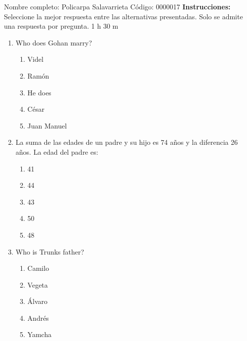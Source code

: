\documentclass[letterpaper,addpoints,answers,twocolumn,10pt]{exam}
\begin{document}
\noindent Nombre completo: Policarpa Salavarrieta
\newline \newline \newline \newline
Código: 0000017\newline \newline 
{\bf Instrucciones:} Seleccione la mejor respuesta entre las alternativas presentadas. Solo se admite una respuesta por pregunta.
 1 h 30 m

\begin{enumerate}[leftmargin=.2in]




\item  Who does Gohan marry?


\begin{enumerate}[noitemsep,leftmargin=0in]


\item  Videl
\item  Ramón
\item  He does
\item  César
\item  Juan Manuel


\end{enumerate}



\item  La suma de las edades de un padre y su hijo es 74 años y la diferencia 26 años. La edad del padre es:


\begin{enumerate}[noitemsep,leftmargin=0in]


\item  41
\item  44
\item  43
\item  50
\item  48


\end{enumerate}



\item  Who is Trunks father?


\begin{enumerate}[noitemsep,leftmargin=0in]


\item  Camilo
\item  Vegeta
\item  Álvaro
\item  Andrés
\item  Yamcha



\end{enumerate}
\end{enumerate}
\end{document}
